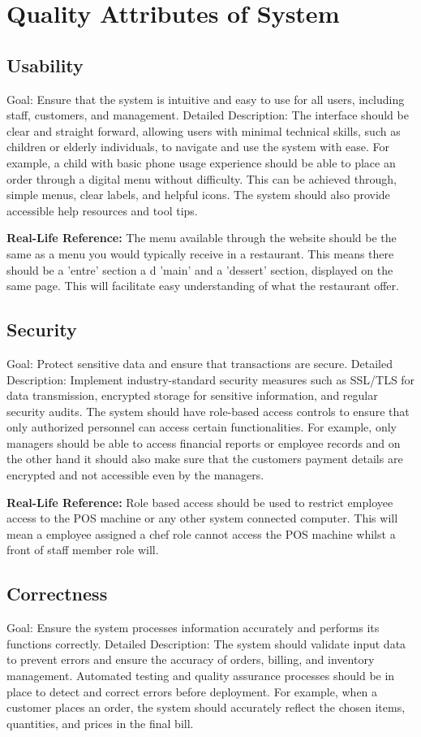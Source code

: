 \documentclass{article}
\begin{document}
\clearpage
\section{Quality Attributes of System}

\subsection{Usability} 
Goal: Ensure that the system is intuitive and easy to use for all users, including staff, 
customers, and management. 
Detailed Description: The interface should be clear and straight forward, allowing users with 
minimal technical skills, such as children or elderly individuals, to navigate and use the 
system with ease. For example, a child with basic phone usage experience should be able to 
place an order through a digital menu without difficulty. This can be achieved through, 
simple menus, clear labels, and helpful icons. The system should also provide accessible help 
resources and tool tips. 


\textbf{Real-Life Reference: } The menu available through the website should be the same as a menu you would typically receive in a restaurant. This means there should be a 'entre' section a d 'main' and a 'dessert' section, displayed on the same page. This will facilitate easy understanding of what the restaurant offer.

\subsection{Security}
Goal: Protect sensitive data and ensure that transactions are secure. 
Detailed Description: Implement industry-standard security measures such as SSL/TLS for 
data transmission, encrypted storage for sensitive information, and regular security audits. 
The system should have role-based access controls to ensure that only authorized personnel 
can access certain functionalities. For example, only managers should be able to access 
financial reports or employee records and on the other hand it should also make sure that 
the customers payment details are encrypted and not accessible even by the managers. 


\textbf{Real-Life Reference: } Role based access should be used to restrict employee access to the POS machine or any other system connected computer. This will mean a employee assigned a chef role cannot access the POS machine whilst a front of staff member role will.
\subsection{Correctness}
Goal: Ensure the system processes information accurately and performs its functions 
correctly. 
Detailed Description: The system should validate input data to prevent errors and ensure 
the accuracy of orders, billing, and inventory management. Automated testing and quality 
assurance processes should be in place to detect and correct errors before deployment. For 
example, when a customer places an order, the system should accurately reflect the chosen 
items, quantities, and prices in the final bill. 
\end{document}
